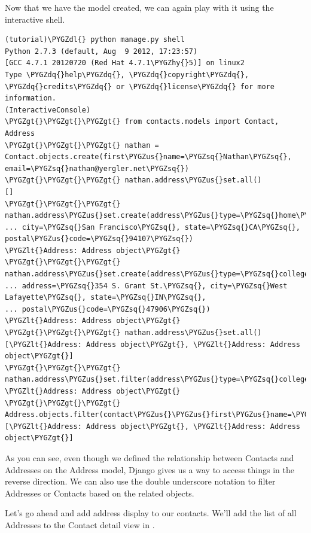 \documentclass[letterpaper,10pt,english]{sphinxmanual}
\def\PYGZus{\char`\_}
\def\PYGZlt{\char`\<}
\def\PYGZgt{\char`\>}
\def\PYGZdl{\char`\$}
\def\PYGZhy{\char`\-}
\def\PYGZsq{\char`\'}
\def\PYGZdq{\char`\"}
\renewcommand\PYGZsq{\textquotesingle}
\begin{document}
Now that we have the model created, we can again play with it using
the interactive shell.

\begin{Verbatim}[commandchars=\\\{\}]
(tutorial)\PYGZdl{} python manage.py shell
Python 2.7.3 (default, Aug  9 2012, 17:23:57)
[GCC 4.7.1 20120720 (Red Hat 4.7.1\PYGZhy{}5)] on linux2
Type \PYGZdq{}help\PYGZdq{}, \PYGZdq{}copyright\PYGZdq{}, \PYGZdq{}credits\PYGZdq{} or \PYGZdq{}license\PYGZdq{} for more information.
(InteractiveConsole)
\PYGZgt{}\PYGZgt{}\PYGZgt{} from contacts.models import Contact, Address
\PYGZgt{}\PYGZgt{}\PYGZgt{} nathan = Contact.objects.create(first\PYGZus{}name=\PYGZsq{}Nathan\PYGZsq{}, email=\PYGZsq{}nathan@yergler.net\PYGZsq{})
\PYGZgt{}\PYGZgt{}\PYGZgt{} nathan.address\PYGZus{}set.all()
[]
\PYGZgt{}\PYGZgt{}\PYGZgt{} nathan.address\PYGZus{}set.create(address\PYGZus{}type=\PYGZsq{}home\PYGZsq{},
... city=\PYGZsq{}San Francisco\PYGZsq{}, state=\PYGZsq{}CA\PYGZsq{}, postal\PYGZus{}code=\PYGZsq{}94107\PYGZsq{})
\PYGZlt{}Address: Address object\PYGZgt{}
\PYGZgt{}\PYGZgt{}\PYGZgt{} nathan.address\PYGZus{}set.create(address\PYGZus{}type=\PYGZsq{}college\PYGZsq{},
... address=\PYGZsq{}354 S. Grant St.\PYGZsq{}, city=\PYGZsq{}West Lafayette\PYGZsq{}, state=\PYGZsq{}IN\PYGZsq{},
... postal\PYGZus{}code=\PYGZsq{}47906\PYGZsq{})
\PYGZlt{}Address: Address object\PYGZgt{}
\PYGZgt{}\PYGZgt{}\PYGZgt{} nathan.address\PYGZus{}set.all()
[\PYGZlt{}Address: Address object\PYGZgt{}, \PYGZlt{}Address: Address object\PYGZgt{}]
\PYGZgt{}\PYGZgt{}\PYGZgt{} nathan.address\PYGZus{}set.filter(address\PYGZus{}type=\PYGZsq{}college\PYGZsq{})
\PYGZlt{}Address: Address object\PYGZgt{}
\PYGZgt{}\PYGZgt{}\PYGZgt{} Address.objects.filter(contact\PYGZus{}\PYGZus{}first\PYGZus{}name=\PYGZsq{}Nathan\PYGZsq{})
[\PYGZlt{}Address: Address object\PYGZgt{}, \PYGZlt{}Address: Address object\PYGZgt{}]
\end{Verbatim}

As you can see, even though we defined the relationship between
Contacts and Addresses on the Address model, Django gives us a way to
access things in the reverse direction. We can also use the double
underscore notation to filter Addresses or Contacts based on the
related objects.

Let's go ahead and add address display to our contacts. We'll add the
list of all Addresses to the Contact detail view in .
\end{document}
